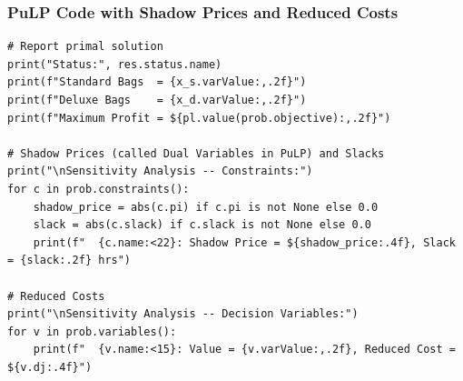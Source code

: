 \documentclass{beamer}
\begin{document}
\begin{frame}[fragile]
\frametitle{PuLP Code with Shadow Prices and Reduced Costs}
\begin{lstlisting}[basicstyle=\ttfamily\scriptsize]
# Report primal solution
print("Status:", res.status.name)
print(f"Standard Bags  = {x_s.varValue:,.2f}")
print(f"Deluxe Bags    = {x_d.varValue:,.2f}")
print(f"Maximum Profit = ${pl.value(prob.objective):,.2f}")

# Shadow Prices (called Dual Variables in PuLP) and Slacks
print("\nSensitivity Analysis -- Constraints:")
for c in prob.constraints():
    shadow_price = abs(c.pi) if c.pi is not None else 0.0
    slack = abs(c.slack) if c.slack is not None else 0.0
    print(f"  {c.name:<22}: Shadow Price = ${shadow_price:.4f}, Slack = {slack:.2f} hrs")

# Reduced Costs
print("\nSensitivity Analysis -- Decision Variables:")
for v in prob.variables():
    print(f"  {v.name:<15}: Value = {v.varValue:,.2f}, Reduced Cost = ${v.dj:.4f}")
\end{lstlisting}
\end{frame}
\end{document}
